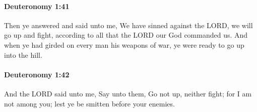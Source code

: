 		\paragraph{Deuteronomy 1:41} %
			\label{DEUTERONOMY-1-41}

			Then ye answered and said unto me, We have sinned against the LORD, we will go up and fight, according to all that the LORD our God commanded us. And when ye had girded on every man his weapons of war, ye were ready to go up into the hill.


		\paragraph{Deuteronomy 1:42} %
			\label{DEUTERONOMY-1-42}

			And the LORD said unto me, Say unto them, Go not up, neither fight; for I am not among you; lest ye be smitten before your enemies.


